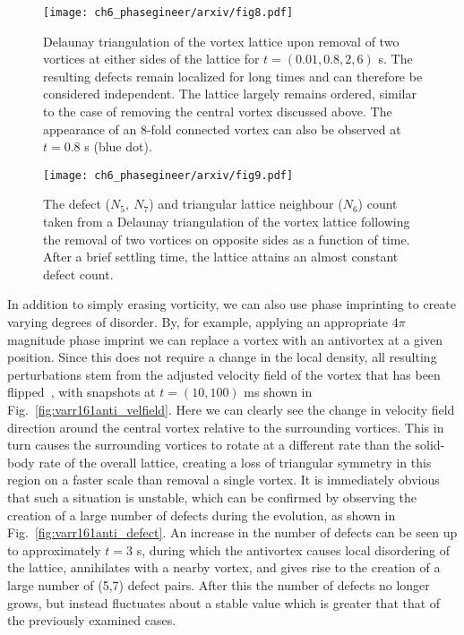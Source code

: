 \begin{figure}\centering
    \texttt{[image: ch6\_phasegineer/arxiv/fig8.pdf]}
    \caption{Delaunay triangulation of the vortex lattice upon removal of two vortices at either sides of the lattice for $t=(0.01,0.8,2,6)$ s. The resulting defects remain localized for long times and can therefore be considered independent. The lattice largely remains ordered, similar to the case of removing the central vortex discussed above. The appearance of an 8-fold connected vortex can also be observed at $t=0.8$ s (blue dot).}\label{fig:traj_2vtx_edge}
\end{figure}

\begin{figure}\centering
    \texttt{[image: ch6\_phasegineer/arxiv/fig9.pdf]}
    \caption{The defect ($N_5,~N_7$) and triangular lattice neighbour ($N_6$) count taken from a Delaunay triangulation of the vortex lattice following the removal of two vortices on opposite sides as a function of time. After a brief settling time, the lattice attains an almost constant defect count.}
    \label{fig:vtx_rem2_edge}
\end{figure}


In addition to simply erasing vorticity, we can also use phase imprinting to create varying degrees of disorder. By, for example, applying an appropriate $4\pi$ magnitude phase imprint we can replace a vortex with an antivortex at a given position. Since this does not require a change in the local density, all resulting perturbations stem from the adjusted velocity field of the vortex that has been flipped~\cite{VTX:Madarassy_gfd_2009}, with snapshots at $t=(10,100)$ ms shown in Fig.~\ref{fig:varr161anti_velfield}. Here we can clearly see the change in velocity field direction around the central vortex relative to the surrounding vortices. This in turn causes the surrounding vortices to rotate at a different rate than the solid-body rate of the overall lattice, creating a loss of triangular symmetry in this region on a faster scale than removal a single vortex. It is immediately obvious that such a situation is unstable, which can be confirmed by observing the creation of a large number of defects during the evolution, as shown in Fig.~\ref{fig:varr161anti_defect}. An increase in the number of defects can be seen up to approximately $t=3$ s, during which the antivortex causes local disordering of the lattice, annihilates with a nearby vortex, and gives rise to the creation of a large number of (5,7) defect pairs. After this the number of defects no longer grows, but instead fluctuates about a stable value which is greater that that of the previously examined cases.

